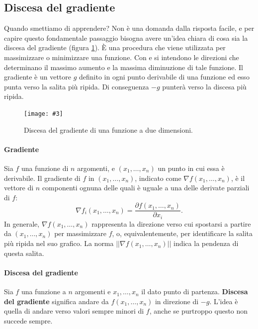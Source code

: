 \documentclass[12pt, twoside, letterpaper]{report}
\newcommand{\img}[4] {
	\begin{figure}
		\centering
		\texttt{[image: \#3]}\\
		\caption{#1}
		\label{fig:#4}
	\end{figure}
}
\begin{document}
			\subsection{Discesa del gradiente}
				Quando smettiamo di apprendere? Non è una domanda dalla risposta facile, e per capire questo fondamentale passaggio bisogna avere un'idea chiara di cosa sia la discesa del gradiente (figura \ref{fig:gradient_descent}). È una procedura che viene utilizzata per massimizzare o minimizzare una funzione. Con  e  si intendono le direzioni che determinano il massimo aumento e la massima diminuzione di tale funzione. Il gradiente è un vettore $g$ definito in ogni punto derivabile di una funzione ed esso punta verso la salita più ripida. Di conseguenza $-g$ punterà verso la discesa più ripida.
				
				\img{Discesa del gradiente di una funzione a due dimensioni. \cite{kriesel}}{0.5}{gradient_descent_2d.png}{gradient_descent}
				
				\paragraph{Gradiente} Sia $f$ una funzione di $n$ argomenti, e $(x_1, \dots, x_n)$ un punto in cui essa è derivabile. Il gradiente di $f$ in $(x_1, \dots, x_n)$, indicato come $\nabla f(x_1, \dots, x_n)$, è il vettore di $n$ componenti ognuna delle quali è uguale a una delle derivate parziali di $f$: 
					$$\nabla f_i(x_1, \dots, x_n) = \frac{\partial f(x_1, \dots, x_n)}{\partial x_i}.$$
					In generale, $\nabla f(x_1, \dots, x_n)$ rappresenta la direzione verso cui spostarsi a partire da $(x_1, \dots, x_n)$ per massimizzare $f$, o, equivalentemente, per identificare la salita più ripida nel suo grafico. La norma $||\nabla f(x_1, \dots, x_n)||$ indica la pendenza di questa salita.
					

				\paragraph{Discesa del gradiente} Sia $f$ una funzione a $n$ argomenti e $x_1, \dots, x_n$ il dato punto di partenza. \textbf{Discesa del gradiente} significa andare da $f(x_1, \dots, x_n)$ in direzione di $-g$. L'idea è quella di andare verso valori sempre minori di $f$, anche se purtroppo questo non succede sempre.
								
\end{document}
